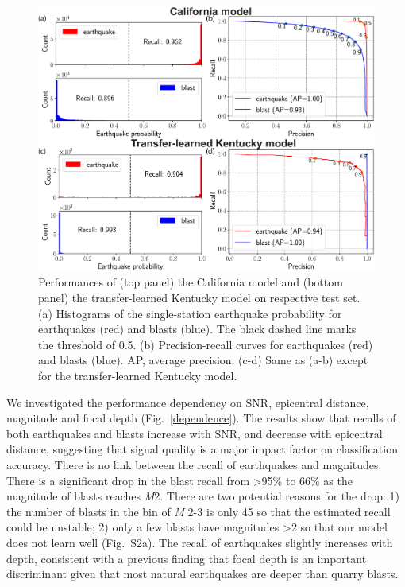 \documentclass{gji}
\begin{document}
\begin{figure}
\centering
\includegraphics[width=.75\textwidth]{histogram.pdf}
\caption{Performances of (top panel) the California model and (bottom panel) the transfer-learned Kentucky model on respective test set. (a) Histograms of the single-station earthquake probability for earthquakes (red) and blasts (blue). The black dashed line marks the threshold of 0.5. (b) Precision-recall curves for earthquakes (red) and blasts (blue). AP, average precision. (c-d) Same as (a-b) except for the transfer-learned Kentucky model.}
\label{histogram}
\end{figure}

We investigated the performance dependency on SNR, epicentral distance, magnitude and focal depth (Fig.~\ref{dependence}). The results show that recalls of both earthquakes and blasts increase with SNR, and decrease with epicentral distance, suggesting that signal quality is a major impact factor on classification accuracy. There is no link between the recall of earthquakes and magnitudes. There is a significant drop in the blast recall from \textgreater{95}\% to 66\% as the magnitude of blasts reaches \textit{M}2. There are two potential reasons for the drop: 1) the number of blasts in the bin of \textit{M} 2-3 is only 45 so that the estimated recall could be unstable; 2) only a few blasts have magnitudes \textgreater{2} so that our model does not learn well (Fig.~S2a). The recall of earthquakes slightly increases with depth, consistent with a previous finding that focal depth is an important discriminant \citep{koper,koper_20} given that most natural earthquakes are deeper than quarry blasts.
\end{document}
